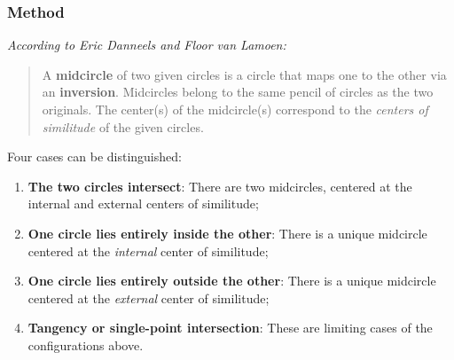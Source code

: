 \begin{tkzexample}[latex=.5\textwidth]
\end{tkzexample}

\subsubsection{Method }
\label{ssub:midcircle}

\medskip
\noindent
\emph{According to Eric Danneels and Floor van Lamoen:}

\begin{quote}
A \textbf{midcircle} of two given circles is a circle that maps one to the other via an \textbf{inversion}. Midcircles belong to the same pencil of circles as the two originals. The center(s) of the midcircle(s) correspond to the \emph{centers of similitude} of the given circles.
\end{quote}

\noindent
Four cases can be distinguished:

\begin{enumerate}[label=(\roman*)]
  \item \textbf{The two circles intersect}: There are two midcircles, centered at the internal and external centers of similitude;
  \item \textbf{One circle lies entirely inside the other}: There is a unique midcircle centered at the \emph{internal} center of similitude;
  \item \textbf{One circle lies entirely outside the other}: There is a unique midcircle centered at the \emph{external} center of similitude;
  \item \textbf{Tangency or single-point intersection}: These are limiting cases of the configurations above.
\end{enumerate}


